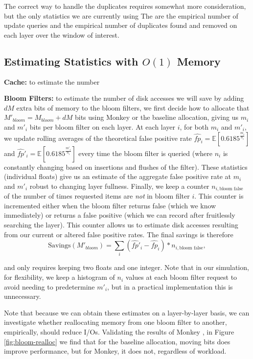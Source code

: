 \documentclass{sig-alternate-05-2015}
\begin{document}
The correct way to handle the duplicates requires somewhat more consideration, but the only statistics we are currently using The are the empirical number of update queries and the empirical number of duplicates found and removed on each layer over the window of interest.


\subsection{Estimating Statistics with $O(1)$ Memory}

\textbf{Cache:} to estimate the number

\textbf{Bloom Filters:} to estimate the number of disk accesses we will save by adding $dM$ extra bits of memory to the bloom filters, we first decide how to allocate that $M'_{bloom} = M_{bloom}+dM$ bits using Monkey or the baseline allocation, giving us $m_i$ and $m'_i$ bits per bloom filter on each layer. At each layer $i$, for both $m_i$ and $m'_i$, we update rolling averages of the theoretical false positive rate $\hat{fp}_i = \mathbb{E}\left[0.6185^{\frac{m_i}{n_i}}\right]$ and $\hat{fp}'_i = \mathbb{E}\left[0.6185^{\frac{m'_i}{n_i}}\right]$ every time the bloom filter is queried (where $n_i$ is constantly changing based on insertions and flushes of the filter). These statistics (individual floats) give us an estimate of the aggregate false positive rate at $m_i$ and $m'_i$ robust to changing layer fullness. Finally, we keep a counter $n_{i,\text{bloom false}}$ of the number of times requested items are \textit{not} in bloom filter $i$. This counter is incremented either when the bloom filter returns false (which we know immediately) or returns a false positive (which we can record after fruitlessly searching the layer). This counter allows us to estimate disk accesses resulting from our current or altered false positive rates. The final savings is therefore \[
  \text{Savings}(M'_{bloom}) = \sum_{i} (\hat{fp}'_i - \hat{fp}_i) * n_{i,\text{bloom false}},
\]

and only requires keeping two floats and one integer. Note that in our simulation, for flexibility, we keep a histogram of $n_i$ values at each bloom filter request to avoid needing to predetermine $m'_i$, but in a practical implementation this is unnecessary.

Note that because we can obtain these estimates on a layer-by-layer basis, we can investigate whether reallocating memory from one bloom filter to another, empirically, should reduce I/Os. Validating the results of Monkey \cite{monkey}, in Figure \ref{fig:bloom-realloc} we find that for the baseline allocation, moving bits does improve performance, but for Monkey, it does not, regardless of workload.
\end{document}
